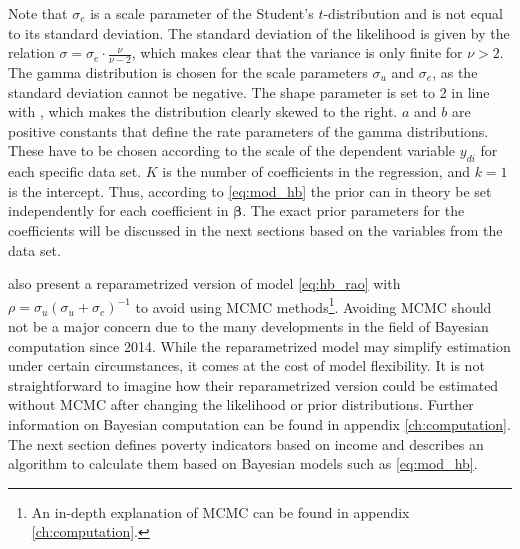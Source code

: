 Note that $\sigma_e$ is a scale parameter of the Student's $t$-distribution and is not equal to its standard deviation.
The standard deviation of the likelihood is given by the relation $\sigma = \sigma_e \cdot \frac{\nu}{\nu - 2}$, which makes clear that the variance is only finite for $\nu > 2$.
The gamma distribution is chosen for the scale parameters $\sigma_u$ and $\sigma_e$, as the standard deviation cannot be negative.
The shape parameter is set to 2 in line with \cite{gelman_prior_2020}, which makes the distribution clearly skewed to the right.
$a$ and $b$ are positive constants that define the rate parameters of the gamma distributions.
These have to be chosen according to the scale of the dependent variable $y_{di}$ for each specific data set.
$K$ is the number of coefficients in the regression, and $k = 1$ is the intercept.
Thus, according to \ref{eq:mod_hb} the prior can in theory be set independently for each coefficient in $\boldsymbol \beta$.
The exact prior parameters for the coefficients will be discussed in the next sections based on the variables from the data set.


\cite{molina_small_2014} also present a reparametrized version of model \ref{eq:hb_rao} with $\rho = \sigma_u(\sigma_u + \sigma_e)^{-1} $ to avoid using MCMC methods\footnote{An in-depth explanation of MCMC can be found in appendix \ref{ch:computation}.}.
Avoiding MCMC should not be a major concern due to the many developments in the field of Bayesian computation since 2014.
While the reparametrized model may simplify estimation under certain circumstances, it comes at the cost of model flexibility. It is not straightforward to imagine how their reparametrized version could be estimated without MCMC after changing the likelihood or prior distributions.
Further information on Bayesian computation can be found in appendix \ref{ch:computation}.
The next section defines poverty indicators based on income and describes an algorithm to calculate them based on Bayesian models such as \ref{eq:mod_hb}.